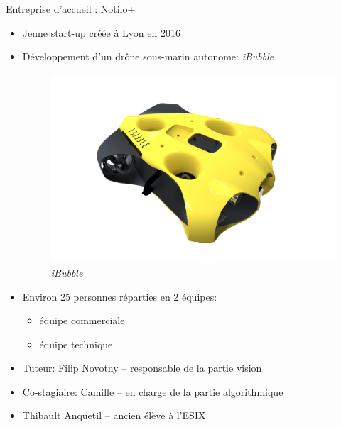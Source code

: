 \documentclass{bredelebeamer}
\begin{document}
\begin{frame}{Entreprise d'accueil : Notilo+}

\begin{itemize}
\item Jeune start-up créée à Lyon en 2016
\item Développement d'un dr\^one sous-marin autonome: \emph{iBubble}
\begin{figure}
\centering
\includegraphics[scale=0.05]{images/iBubble3.png}
\caption{\emph{iBubble}}
\end{figure}
\item Environ 25 personnes réparties en 2 équipes:
	\begin{itemize}
	\item équipe commerciale
	\item équipe technique
	\end{itemize}
\item Tuteur: Filip Novotny -- responsable de la partie vision
\item Co-stagiaire: Camille -- en charge de la partie algorithmique
\item Thibault Anquetil -- ancien élève à l'ESIX
\end{itemize}

\end{frame}

\end{document}
